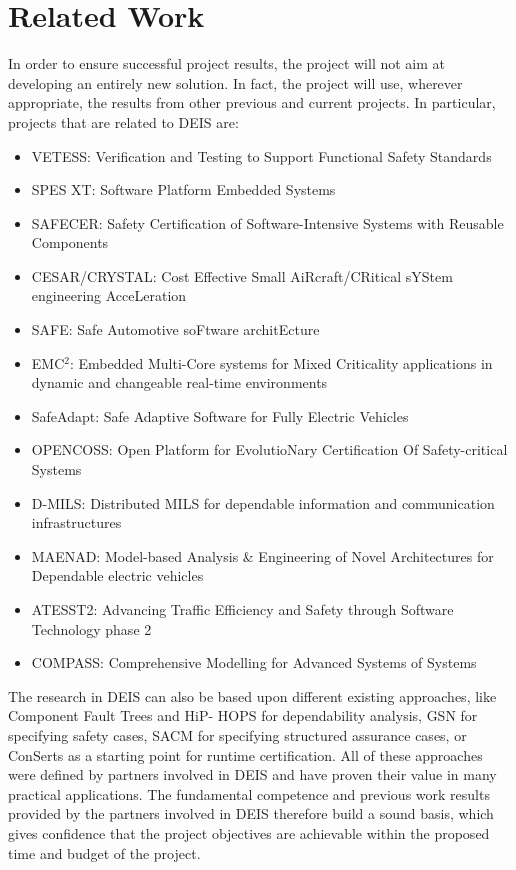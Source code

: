 \section{Related Work}
In order to ensure successful project results, the project will not aim at developing an entirely new solution. In fact, the project will use, wherever appropriate, the results from other previous and current projects. In particular, projects that are related to DEIS are: 
\begin{itemize}
	\item VETESS: Verification and Testing to Support Functional Safety Standards
	\item SPES XT: Software Platform Embedded Systems
	\item SAFECER: Safety Certification of Software-Intensive Systems with Reusable Components
	\item CESAR/CRYSTAL: Cost Effective Small AiRcraft/CRitical sYStem engineering AcceLeration
	\item SAFE: Safe Automotive soFtware architEcture
	\item EMC$^2$: Embedded Multi-Core systems for Mixed Criticality applications in dynamic and changeable real-time environments
	\item SafeAdapt: Safe Adaptive Software for Fully Electric Vehicles
	\item OPENCOSS: Open Platform for EvolutioNary Certification Of Safety-critical Systems 
	\item D-MILS: Distributed MILS for dependable information and communication infrastructures
	\item MAENAD: Model-based Analysis \& Engineering of Novel Architectures for Dependable electric vehicles
	\item ATESST2: Advancing Traffic Efficiency and Safety through Software Technology phase 2
	\item COMPASS: Comprehensive Modelling for Advanced Systems of Systems
\end{itemize}

The research in DEIS can also be based upon different existing approaches, like Component Fault Trees \cite{Kaiser2003} and HiP- HOPS \cite{Papadopoulos1999} for dependability analysis, GSN \cite{kelly2004goal} for specifying safety cases, SACM \cite{sacm2} for specifying structured assurance cases,  or ConSerts \cite{Schneider2003} as a starting point for runtime certification. All of these approaches were defined by partners involved in DEIS and have proven their value in many practical applications. The fundamental competence and previous work results provided by the partners involved in DEIS therefore build a sound basis, which gives confidence that the project objectives are achievable within the proposed time and budget of the project.